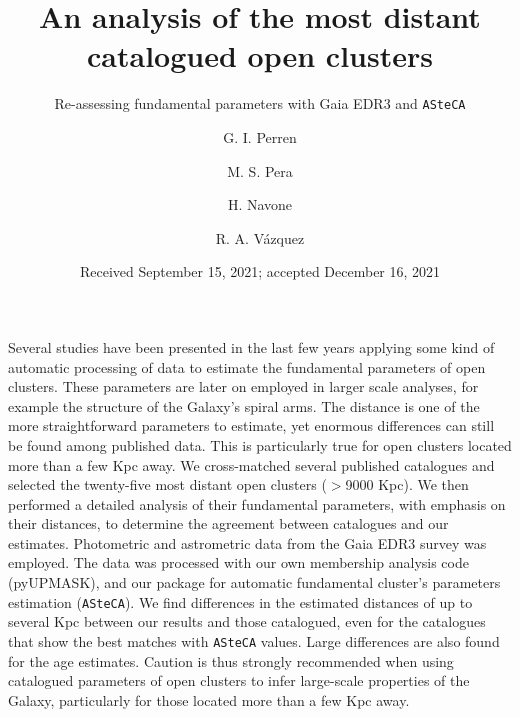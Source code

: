 \documentclass{aa}
\begin{document}
 


\title{An analysis of the most distant catalogued open clusters}
\subtitle{Re-assessing fundamental parameters with Gaia EDR3 and \texttt{ASteCA}}

\author{G. I. Perren
      \and
      M. S. Pera
      \and
      H. Navone
      \and
      R. A. Vázquez
}

\date{Received September 15, 2021; accepted December 16, 2021}

 
\abstract
{Several studies have been presented in the last few years applying some kind of
automatic processing of data to estimate the fundamental parameters of open
clusters. These parameters are later on employed in larger scale analyses, for
example the structure of the Galaxy's spiral arms.
The distance is one of the more straightforward parameters to estimate, yet
enormous differences can still be found among published data. This is
particularly true for open clusters located more than a few Kpc away.}
{
We cross-matched several published catalogues and selected the twenty-five most
distant open clusters ($>$9000 Kpc). We then performed a detailed analysis of
their fundamental parameters, with emphasis on their distances, to determine the
agreement between catalogues and our estimates.}
{Photometric and astrometric data from the Gaia EDR3 survey was employed. The
data was processed with our own membership analysis code (pyUPMASK), and our
package for automatic fundamental cluster's parameters estimation
(\texttt{ASteCA}).}
{We find differences in the estimated distances of up to several Kpc
between our results and those catalogued, even for the catalogues that show the
best matches with \texttt{ASteCA} values. Large differences are also found for
the age estimates.}
{Caution is thus strongly recommended when using catalogued parameters of open
clusters to infer large-scale properties of the Galaxy, particularly for those
located more than a few Kpc away.}
\end{document}
